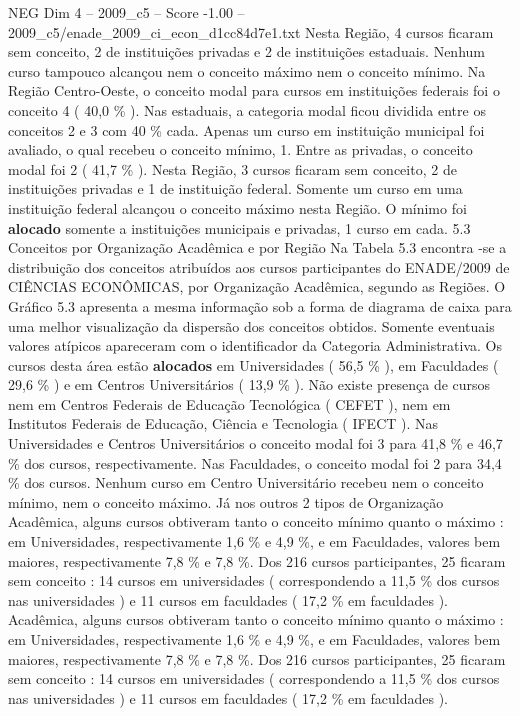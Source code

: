 \begin{textsample}{NEG Dim 4 – 2009\_c5 – Score -1.00 – 2009\_c5/enade\_2009\_ci\_econ\_d1cc84d7e1.txt}
Nesta Região, 4 cursos ficaram sem conceito, 2 de instituições privadas e 2 de instituições estaduais.
Nenhum curso tampouco alcançou nem o conceito máximo nem o conceito mínimo.
Na Região Centro-Oeste, o conceito modal para cursos em instituições federais foi o conceito 4 ( 40,0 \% ).
Nas estaduais, a categoria modal ficou dividida entre os conceitos 2 e 3 com 40 \% cada.
Apenas um curso em instituição municipal foi avaliado, o qual recebeu o conceito mínimo, 1.
Entre as privadas, o conceito modal foi 2 ( 41,7 \% ).
Nesta Região, 3 cursos ficaram sem conceito, 2 de instituições privadas e 1 de instituição federal.
Somente um curso em uma instituição federal alcançou o conceito máximo nesta Região.
O mínimo foi \textbf{alocado} somente a instituições municipais e privadas, 1 curso em cada. 5.3 Conceitos por Organização Acadêmica e por Região Na Tabela 5.3 encontra -se a distribuição dos conceitos atribuídos aos cursos participantes do ENADE/2009 de CIÊNCIAS ECONÔMICAS, por Organização Acadêmica, segundo as Regiões.
O Gráfico 5.3 apresenta a mesma informação sob a forma de diagrama de caixa para uma melhor visualização da dispersão dos conceitos obtidos.
Somente eventuais valores atípicos apareceram com o identificador da Categoria Administrativa.
Os cursos desta área estão \textbf{alocados} em Universidades ( 56,5 \% ), em Faculdades ( 29,6 \% ) e em Centros Universitários ( 13,9 \% ).
Não existe presença de cursos nem em Centros Federais de Educação Tecnológica ( CEFET ), nem em Institutos Federais de Educação, Ciência e Tecnologia ( IFECT ).
Nas Universidades e Centros Universitários o conceito modal foi 3 para 41,8 \% e 46,7 \% dos cursos, respectivamente.
Nas Faculdades, o conceito modal foi 2 para 34,4 \% dos cursos.
Nenhum curso em Centro Universitário recebeu nem o conceito mínimo, nem o conceito máximo.
Já nos outros 2 tipos de Organização Acadêmica, alguns cursos obtiveram tanto o conceito mínimo quanto o máximo : em Universidades, respectivamente 1,6 \% e 4,9 \%, e em Faculdades, valores bem maiores, respectivamente 7,8 \% e 7,8 \%.
Dos 216 cursos participantes, 25 ficaram sem conceito : 14 cursos em universidades ( correspondendo a 11,5 \% dos cursos nas universidades ) e 11 cursos em faculdades ( 17,2 \% em faculdades ).
Acadêmica, alguns cursos obtiveram tanto o conceito mínimo quanto o máximo : em Universidades, respectivamente 1,6 \% e 4,9 \%, e em Faculdades, valores bem maiores, respectivamente 7,8 \% e 7,8 \%.
Dos 216 cursos participantes, 25 ficaram sem conceito : 14 cursos em universidades ( correspondendo a 11,5 \% dos cursos nas universidades ) e 11 cursos em faculdades ( 17,2 \% em faculdades ).

\end{textsample}
